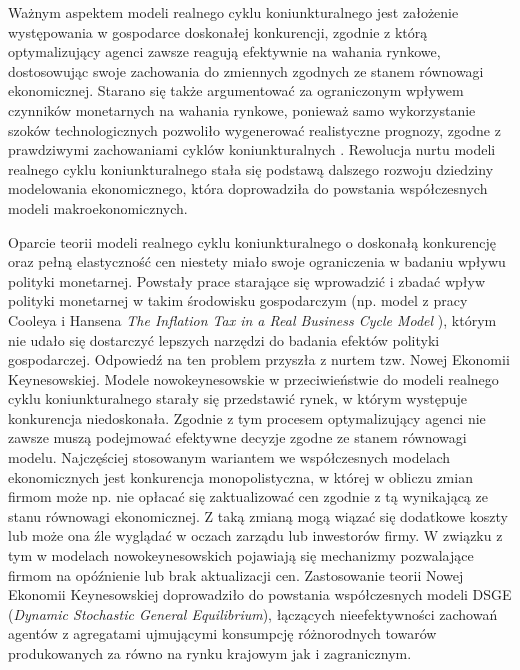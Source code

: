 Ważnym aspektem modeli realnego cyklu koniunkturalnego jest założenie występowania w gospodarce doskonałej konkurencji, zgodnie z którą optymalizujący agenci zawsze reagują efektywnie na wahania rynkowe, dostosowując swoje zachowania do zmiennych zgodnych ze stanem równowagi ekonomicznej. Starano się także argumentować za ograniczonym wpływem czynników monetarnych na wahania rynkowe, ponieważ samo wykorzystanie szoków technologicznych pozwoliło wygenerować realistyczne prognozy, zgodne z prawdziwymi zachowaniami cyklów koniunkturalnych \cite{gali}. Rewolucja nurtu modeli realnego cyklu koniunkturalnego stała się podstawą dalszego rozwoju dziedziny modelowania ekonomicznego, która doprowadziła do powstania współczesnych modeli makroekonomicznych. 

Oparcie teorii modeli realnego cyklu koniunkturalnego o doskonałą konkurencję oraz pełną elastyczność cen niestety miało swoje ograniczenia w badaniu wpływu polityki monetarnej. Powstały prace starające się wprowadzić i zbadać wpływ polityki monetarnej w takim środowisku gospodarczym (np. model z pracy Cooleya i Hansena \emph{The Inflation Tax in a Real Business Cycle Model} \cite{cooley_hansen}), którym nie udało się dostarczyć lepszych narzędzi do badania efektów polityki gospodarczej. Odpowiedź na ten problem przyszła z nurtem tzw. Nowej Ekonomii Keynesowskiej. Modele nowokeynesowskie w przeciwieństwie do modeli realnego cyklu koniunkturalnego starały się przedstawić rynek, w którym występuje konkurencja niedoskonała. Zgodnie z tym procesem optymalizujący agenci nie zawsze muszą podejmować efektywne decyzje zgodne ze stanem równowagi modelu. Najczęściej stosowanym wariantem we współczesnych modelach ekonomicznych jest konkurencja monopolistyczna, w której w obliczu zmian firmom może np. nie opłacać się zaktualizować cen zgodnie z tą wynikającą ze stanu równowagi ekonomicznej. Z taką zmianą mogą wiązać się dodatkowe koszty lub może ona źle wyglądać w oczach zarządu lub inwestorów firmy. W związku z tym w modelach nowokeynesowskich pojawiają się mechanizmy pozwalające firmom na opóźnienie lub brak aktualizacji cen. Zastosowanie teorii Nowej Ekonomii Keynesowskiej doprowadziło do powstania współczesnych modeli DSGE (\emph{Dynamic Stochastic General Equilibrium}), łączących nieefektywności zachowań agentów z agregatami ujmującymi konsumpcję różnorodnych towarów produkowanych za równo na rynku krajowym jak i zagranicznym.

